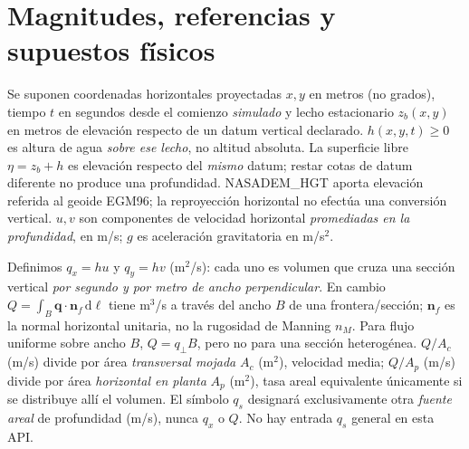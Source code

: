 \documentclass[11pt,a4paper]{article}
\newcommand{\dd}{\mathrm d}
\begin{document}
\section{Magnitudes, referencias y supuestos físicos}
\label{sec:simbolos}
Se suponen coordenadas horizontales proyectadas $x,y$ en metros (no grados), tiempo $t$ en segundos desde el comienzo \emph{simulado} y lecho estacionario $z_b(x,y)$ en metros de elevación respecto de un datum vertical declarado. $h(x,y,t)\geq0$ es altura de agua \emph{sobre ese lecho}, no altitud absoluta. La superficie libre $\eta=z_b+h$ es elevación respecto del \emph{mismo} datum; restar cotas de datum diferente no produce una profundidad. NASADEM\_HGT aporta elevación referida al geoide EGM96; la reproyección horizontal no efectúa una conversión vertical. $u,v$ son componentes de velocidad horizontal \emph{promediadas en la profundidad}, en m/s; $g$ es aceleración gravitatoria en m/s$^2$.

Definimos $q_x=hu$ y $q_y=hv$ (m$^2$/s): cada uno es volumen que cruza una sección vertical \emph{por segundo y por metro de ancho perpendicular}. En cambio $Q=\int_B\boldsymbol q\cdot\boldsymbol n_{\!f}\,\dd\ell$ tiene m$^3$/s a través del ancho $B$ de una frontera/sección; $\boldsymbol n_{\!f}$ es la normal horizontal unitaria, no la rugosidad de Manning $n_M$. Para flujo uniforme sobre ancho $B$, $Q=q_{\perp}B$, pero no para una sección heterogénea. $Q/A_c$ (m/s) divide por área \emph{transversal mojada} $A_c$ (m$^2$), velocidad media; $Q/A_p$ (m/s) divide por área \emph{horizontal en planta} $A_p$ (m$^2$), tasa areal equivalente únicamente si se distribuye allí el volumen. El símbolo $q_s$ designará exclusivamente otra \emph{fuente areal} de profundidad (m/s), nunca $q_x$ o $Q$. No hay entrada $q_s$ general en esta API.
\end{document}
